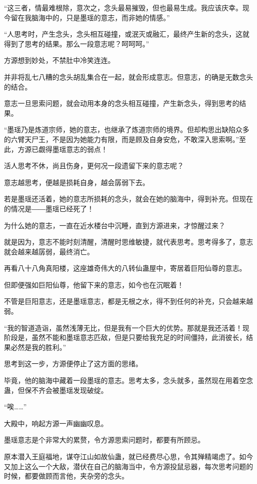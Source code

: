 \begin{this_body}
“这三者，情最难根除，意次之，念头最易摧毁，但也最易生成。我应该庆幸。现今留在我脑海中的，只是墨瑶的意志，而非她的情感。”

“人思考时，产生念头，念头相互碰撞，或泯灭或融汇，最终产生新的念头，这就得到了思考的结果。那么一段意志呢？呵呵呵。”

方源想到妙处，不禁肚中冷笑连连。

并非将乱七八糟的念头胡乱集合在一起，就会形成意志。但意志，的确是无数念头的结合。

意志一旦思索问题，就会动用本身的念头相互碰撞，产生新念头，得到思考的结果。

“墨瑶乃是炼道宗师，她的意志，也继承了炼道宗师的境界。但却构思出缺陷众多的六臂天尸王，不是因为她能力有限，而是顾及自身安危，不敢深入思索啊。”至此，方源已觑得墨瑶意志的弱点！

活人思考不休，尚且伤身，更何况一段遗留下来的意志呢？

意志越思考，便越是损耗自身，越会孱弱下去。

若是墨瑶还活着，她的意志所损耗的念头，就会在她的脑海中，得到补充。但现在的情况是――墨瑶已经死了！

为什么她的意志，一直在近水楼台中沉睡，直到方源进来，才惊醒过来？

就是因为，意志不能时刻清醒，清醒时思维敏捷，就代表思考。思考得多了，意志就会越来越孱弱，最终消亡。

再看八十八角真阳楼，这座雄奇伟大的八转仙蛊屋中，寄居着巨阳仙尊的意志。

但即便强如巨阳仙尊，他留下来的意志，如今也在沉眠着！

不管是巨阳意志，还是墨瑶意志，都是无根之水，得不到任何的补充，只会越来越弱。

“我的智道造诣，虽然浅薄无比，但是我有一个巨大的优势。那就是我还活着！现阶段是，虽然不能和墨瑶意志匹敌，但是只要给我充足的时间僵持，此消彼长，结果必然是我的胜利。”

思考到这一步，方源便停止了这方面的思绪。

毕竟，他的脑海中藏着一段墨瑶的意志。思考太多，念头就多，虽然现在用着空念蛊，但保不齐会被墨瑶发现破绽。

“唉……”

大殿中，响起方源一声幽幽叹息。

墨瑶意志是个非常大的累赘，令方源思索问题时，都要有所顾忌。

原本潜入王庭福地，谋夺江山如故仙蛊，就已经费尽心思，令其殚精竭虑了。如今又加上这么一个大敌，潜伏在自己的脑海当中，令方源投鼠忌器，每次思考问题的时候，都要做顾而言他，夹杂旁的念头。


\end{this_body}

